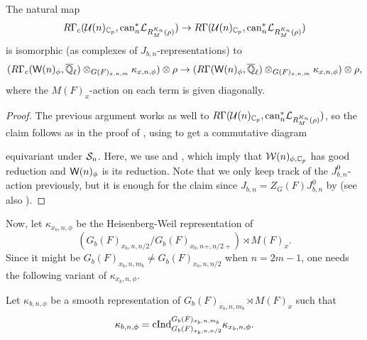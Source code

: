 \documentclass[12pt,reqno]{amsart}
\begin{document}
\begin{prop} \label{prop:nearby_cycle_positive_depth}
    The natural map 
    \[
        R\Gamma_c({\mathcal{U}}(n)_{\mathbb{C}_p}, {\operatorname{can}}_n^*{\mathcal{L}}_{R^{K_n}_M(\rho)}) \to R\Gamma({\mathcal{U}}(n)_{\mathbb{C}_p}, {\operatorname{can}}_n^*{\mathcal{L}}_{R^{K_n}_M(\rho)})
    \]
    is isomorphic (as complexes of $J_{b, n}$-representations) to 
    \[
        (R\Gamma_c({\mathsf{W}}(n)_\phi, {\overline{\mathbb{Q}}_\ell}) \otimes_{G(F)_{x, n, m}} \kappa_{x, n, \phi}) \otimes \rho \to (R\Gamma({\mathsf{W}}(n)_\phi, {\overline{\mathbb{Q}}_\ell}) \otimes_{G(F)_{x, n, m}} \kappa_{x, n, \phi}) \otimes \rho, 
    \]
    where the $M(F)_x$-action on each term is given diagonally. 
\end{prop}
\begin{proof}
    The previous argument works as well to $R\Gamma({\mathcal{U}}(n)_{\mathbb{C}_p}, {\operatorname{can}}_n^*{\mathcal{L}}_{R^{K_n}_M(\rho)})$, so the claim follows as in the proof of , using \cite[Lemma 4.5]{Tsu16} to get a commutative diagram
    \begin{center}
    \end{center}
    equivariant under ${\mathcal{S}}_n$. Here, we use  and , which imply that ${\mathcal{W}}(n)_{\phi, \mathbb{C}_p}$ has good reduction and ${\mathsf{W}}(n)_\phi$ is its reduction. Note that we only keep track of the $J_{b, n}^0$-action previously, but it is enough for the claim since $J_{b, n} = Z_G(F)J_{b, n}^0$ by  (see also ). 
\end{proof}

Now, let $\kappa_{x_b, n, \phi}$ be the Heisenberg-Weil representation of
\[
    (G_b(F)_{x_b, n, n/2} / G_b(F)_{x_b, n+, n/2+}) \rtimes M(F)_x. 
\]
Since it might be $G_b(F)_{x_b, n, m_b} \neq G_b(F)_{x_b, n, n/2}$ when $n = 2m - 1$, one needs the following variant of $\kappa_{x_b, n, \phi}$. 

\begin{defi}
    Let $\kappa_{b, n, \phi}$ be a smooth representation of $G_b(F)_{x_b, n, m_b} \rtimes M(F)_x$ such that 
    \[
        \kappa_{b, n, \phi} = {\operatorname{cInd}}_{G_b(F)_{x_b, n, n/2}}^{G_b(F)_{x_b, n, m_b}} \kappa_{x_b, n, \phi}. 
    \]
\end{defi}
\end{document}
